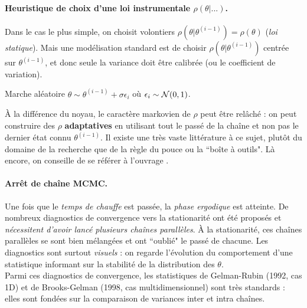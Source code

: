 \paragraph{Heuristique de choix d'une loi instrumentale $\rho(\theta|...)$.} Dans le cas le plus simple, on choisit volontiers  $\rho(\theta|\theta^{(i-1)})=\rho(\theta)$ (\emph{loi statique}). Mais une modélisation standard est de choisir $\rho(\theta|\theta^{(i-1)})$ centrée sur $\theta^{(i-1)}$, et donc seule la variance doit être calibrée (ou le coefficient de variation). \\

\begin{exo}
Marche aléatoire $\theta \sim \theta^{(i-1)} +  \sigma \epsilon_i$ où $\epsilon_i \sim {\cal{N}}(0,1)$. \\
\end{exo}

\`A la différence du noyau, le caractère markovien de $\rho$ peut être relâché : on peut construire des $\rho$ {\bf adaptatives} en
utilisant tout le passé de la chaîne et non pas le dernier état connu $\theta^{(i-1)}$. Il existe une très vaste littérature à ce sujet, plutôt du domaine de la recherche que de la règle du pouce ou la ``boîte à outils". Là encore, on conseille de se référer à l'ouvrage \cite{Marin2007}. \\

\paragraph{Arrêt de chaîne MCMC.} Une fois que le \emph{temps de chauffe} est passée, la \emph{phase ergodique} est atteinte. De nombreux diagnostics de convergence vers la stationarité ont été proposés \cite{Cowles1996} et \emph{nécessitent d'avoir lancé plusieurs chaînes parallèles}. \`A la stationarité, ces chaînes parallèles se sont bien mélangées et ont ``oublié" le passé de chacune. Les diagnostics sont surtout \emph{visuels} : on regarde l'évolution du comportement d'une statistique informant sur la stabilité
de la distribution des $\theta$. \\

Parmi ces diagnostics de convergence, les statistiques de Gelman-Rubin (1992, cas 1D) et de Brooks-Gelman (1998, cas multidimensionnel) sont très standards : elles sont fondées sur la comparaison de variances inter et intra chaînes. \\

